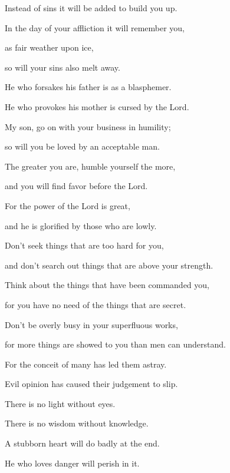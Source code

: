 {\par }{\QB Instead of sins it will be added to build you up.
\par }{\Q {}In the day of your affliction it will remember you,
\par }{\QB as fair weather upon ice,
\par }{\QB so will your sins also melt away.
\par }{\Q {}He who forsakes his father is as a blasphemer.
\par }{\QB He who provokes his mother is cursed by the Lord.
\par }{\BB \par }{\Q {}My son, go on with your business in humility;
\par }{\QB so will you be loved by an acceptable man.
\par }{\Q {}The greater you are, humble yourself the more,
\par }{\QB and you will find favor before the Lord.
\par }{\Q {}For the power of the Lord is great,
\par }{\QB and he is glorified by those who are lowly.
\par }{\Q {}Don’t seek things that are too hard for you,
\par }{\QB and don’t search out things that are above your strength.
\par }{\Q {}Think about the things that have been commanded you,
\par }{\QB for you have no need of the things that are secret.
\par }{\Q {}Don’t be overly busy in your superfluous works,
\par }{\QB for more things are showed to you than men can understand.
\par }{\Q {}For the conceit of many has led them astray.
\par }{\QB Evil opinion has caused their judgement to slip.
\par }{\Q {}There is no light without eyes.
\par }{\QB There is no wisdom without knowledge.
\par }{\BB \par }{\Q {}A stubborn heart will do badly at the end.
\par }{\QB He who loves danger will perish in it.
}
